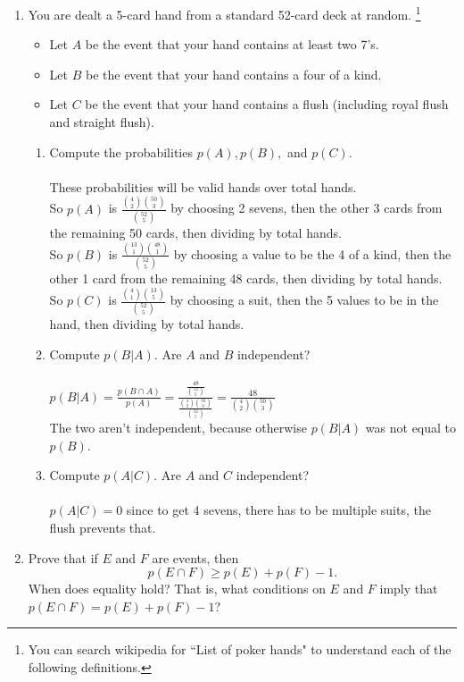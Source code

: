 \documentclass[12pt]{letter}
\begin{document}
\begin{enumerate}
\item You are dealt a 5-card hand from a standard 52-card deck at random. \footnote{You can search wikipedia for ``List of poker hands" to understand each of the following definitions.}
\begin{itemize}
\item Let $A$ be the event that your hand contains at least two 7's.
\item Let $B$ be the event that your hand contains a four of a kind. 
\item Let $C$ be the event that your hand contains a flush (including royal flush and straight flush). 
\end{itemize}
\begin{enumerate}
\item Compute the probabilities $p(A), p(B),$ and $p(C)$.\\\\
These probabilities will be valid hands over total hands.\\
So $p(A)$ is  $\frac{\binom{4}{2}\binom{50}{3}}{\binom{52}{5}}$ by choosing 2 sevens, then the other 3 cards from the remaining 50 cards, then dividing by total hands.\\
So $p(B)$ is  $\frac{\binom{13}{1}\binom{48}{1}}{\binom{52}{5}}$ by choosing a value to be the 4 of a kind, then the other 1 card from the remaining 48 cards, then dividing by total hands.\\
So $p(C)$ is  $\frac{\binom{4}{1}\binom{13}{5}}{\binom{52}{5}}$ by choosing a suit, then the 5 values to be in the hand, then dividing by total hands.\\
\item Compute $p(B | A)$. Are $A$ and $B$ independent?\\\\
$p(B | A) = \frac{p(B \cap A)}{p(A)} = \frac{\frac{48}{\binom{52}{5}}}{\frac{\binom{4}{2}\binom{50}{3}}{\binom{52}{5}}} = \frac{48}{\binom{4}{2}\binom{50}{3}}$\\
The two aren't independent, because otherwise $p(B | A)$ was not equal to $p(B)$.
\item Compute $p(A | C)$. Are $A$ and $C$ independent?\\\\
$p(A | C) = 0$ since to get 4 sevens, there has to be multiple suits, the flush prevents that.
\end{enumerate}

\medskip
\item Prove that if $E$ and $F$ are events, then \[p(E \cap F) \geq p(E) + p(F) - 1.\] When does equality hold? That is, what conditions on $E$ and $F$ imply that $p(E \cap F) = p(E) + p(F) - 1$? 


\end{enumerate}
\end{document}
